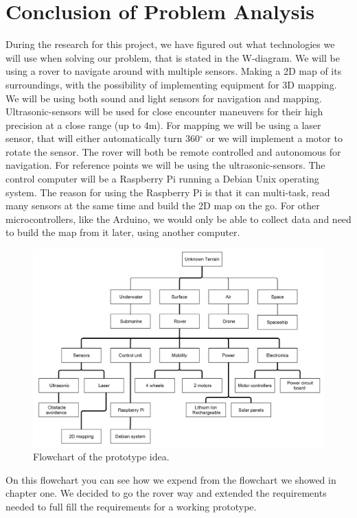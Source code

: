 \section{Conclusion of Problem Analysis}

During the research for this project, we have figured out what technologies we will use when solving our problem, that is stated in the W-diagram.
We will be using a rover to navigate around with multiple sensors. Making a 2D map of its surroundings, with the possibility of implementing equipment for 3D mapping. We will be using both sound and light sensors for navigation and mapping. Ultrasonic-sensors will be used for close encounter maneuvers for their high precision at a close range (up to 4m)\cite{ultra}. For mapping we will be using a laser sensor, that will either automatically turn 360$^{\circ}$  or we will implement a motor to rotate the sensor.
The rover will both be remote controlled and autonomous for navigation. For reference points we will be using the ultrasonic-sensors. The control computer will be a Raspberry Pi running a Debian Unix operating system. The reason for using the Raspberry Pi is that it can multi-task, read many sensors at the same time and build the 2D map on the go. For other microcontrollers, like the Arduino, we would only be able to collect data and need to build the map from it later, using another computer.

\begin{figure}[H]
	\centering
	\includegraphics[scale=.1]{images/level3.png}
	\caption{Flowchart of the prototype idea.}
	\label{fig:level3}
\end{figure}

On this flowchart you can see how we expend from the flowchart we showed in chapter one. We decided to go the rover way and extended the requirements needed to full fill the requirements for a working prototype.

\clearpage
